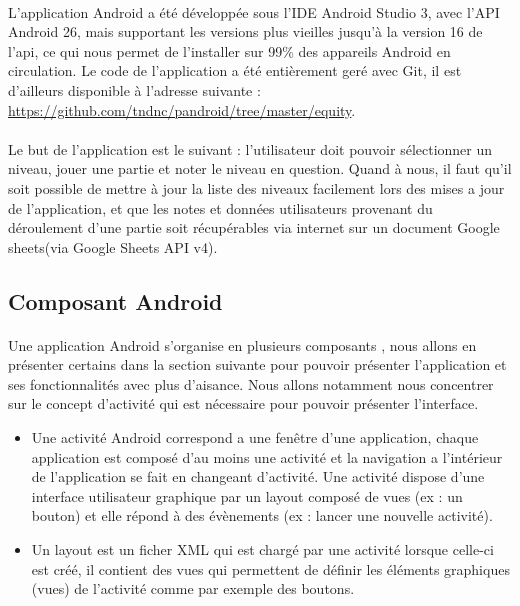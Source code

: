 \documentclass[a4paper, 11pt]{article}
\begin{document}
	\paragraph{}L'application Android a été développée sous l'IDE Android Studio 3, avec l'API Android 26, mais supportant les versions plus vieilles jusqu'à la version 16 de l'api, ce qui nous permet de l'installer sur 99\% des appareils Android en circulation. Le code de l'application a été entièrement geré avec Git, il est d'ailleurs  disponible à l'adresse suivante :  \url{https://github.com/tndnc/pandroid/tree/master/equity}. 
	\paragraph{}Le but de l'application est le suivant : l'utilisateur doit pouvoir sélectionner un niveau, jouer une partie et noter le niveau en question. Quand à nous, il faut qu'il soit possible de mettre à jour la liste des niveaux facilement lors des mises a jour de l'application, et que les notes et données utilisateurs provenant du déroulement d'une partie soit récupérables via internet sur un document Google sheets(via Google Sheets API v4).  
	
	\subsection{Composant Android}
	\paragraph{} Une application Android s'organise en plusieurs composants , nous allons en présenter certains dans la section suivante pour pouvoir présenter l'application et ses fonctionnalités avec plus d'aisance. Nous allons notamment nous concentrer sur le concept d'activité qui est nécessaire pour pouvoir présenter l'interface.
\hfill \break
\begin{itemize}
	\item Une activité Android correspond a une fenêtre d'une application, chaque application est composé d'au moins une activité et la navigation a l'intérieur de l'application se fait en changeant d'activité. Une activité dispose d'une interface utilisateur graphique  par un layout composé de vues (ex : un bouton) et elle répond à des évènements (ex : lancer une nouvelle activité).
	\item Un layout est un ficher XML qui est chargé par une activité lorsque celle-ci est créé, il contient des vues qui permettent de définir les éléments graphiques (vues) de l'activité comme par exemple des boutons.
\end{itemize}
\end{document}
